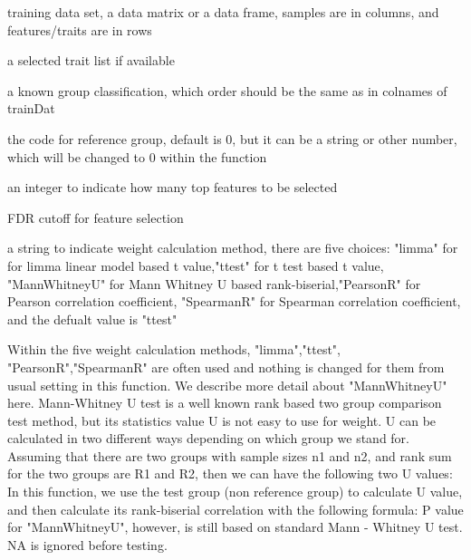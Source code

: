 \documentclass[letterpaper]{book}
\begin{document}
\begin{Arguments}
\begin{ldescription}
\item[\code{trainDat}] training data set, a data matrix or a data frame, samples are in columns, 
and features/traits are in rows

\item[\code{selectedTraits}] a selected trait list if available

\item[\code{groupInfo}] a known group classification, which order should be the same as in colnames of trainDat

\item[\code{refGroup}] the code for reference group, default is 0, but it can be a string or other number, 
which will be changed to 0 within the function

\item[\code{topN}] an integer to indicate how many top features to be selected

\item[\code{FDRcut}] FDR cutoff for feature selection

\item[\code{weightMethod}] a string to indicate weight calculation method, there are five choices: 
"limma" for for limma linear model based t value,"ttest" for t test based t value, 
"MannWhitneyU" for Mann Whitney U based rank-biserial,"PearsonR" for Pearson correlation coefficient,
"SpearmanR" for Spearman correlation coefficient, and the defualt value is "ttest"
\end{ldescription}
\end{Arguments}
%
\begin{Details}\relax
Within the five weight calculation methods, "limma","ttest", "PearsonR","SpearmanR" are often used and nothing 
is changed for them from usual setting in this function. We describe more detail about "MannWhitneyU" here. 
Mann-Whitney U test is a well known rank based two group comparison test method, but its statistics value U is not easy 
to use for weight. U can be calculated in two different ways depending on which group we stand for. 
Assuming that there are two groups with sample sizes n1 and n2, and rank sum for the two groups are R1 and R2, 
then we can have the following two U values:
In this function, we use the test group (non reference group) to calculate U value, and then calculate 
its rank-biserial correlation with the following formula:
P value for "MannWhitneyU", however, is still based on standard Mann - Whitney U test.
NA is ignored before testing.
\end{Details}
\end{document}
